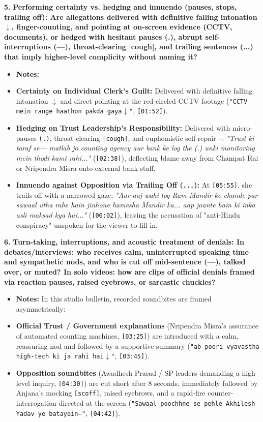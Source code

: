 \documentclass[10pt,a4paper]{article}
\begin{document}
\noindent\textbf{5.} \textbf{Performing certainty vs. hedging and innuendo (pauses, stops, trailing off): Are allegations delivered with definitive falling intonation $\downarrow$, finger-counting, and pointing at on-screen evidence (CCTV, documents), or hedged with hesitant pauses (.), abrupt self-interruptions (---), throat-clearing [cough], and trailing sentences (...) that imply higher-level complicity without naming it?}\par\smallskip
\begin{itemize}
  \item \textbf{Notes:}
  \item \textbf{Certainty on Individual Clerk's Guilt:} Delivered with definitive falling intonation \texttt{$\downarrow$} and direct pointing at the red-circled CCTV footage (\texttt{"CCTV mein range haathon pakda gaya$\downarrow$"}, \texttt{[01:52]}).
  \item \textbf{Hedging on Trust Leadership's Responsibility:} Delivered with micro-pauses \texttt{(.)}, throat-clearing \texttt{[cough]}, and euphemistic self-repair \texttt{---}: \textit{"Trust ki taraf se--- matlab jo counting agency aur bank ke log the (.) unki monitoring mein thodi kami rahi..."} (\texttt{[02:38]}), deflecting blame away from Champat Rai or Nripendra Misra onto external bank staff.
  \item \textbf{Innuendo against Opposition via Trailing Off (\texttt{...}):} At \texttt{[05:55]}, she trails off with a narrowed gaze: \textit{"Aur aaj wahi log Ram Mandir ke chande par sawaal utha rahe hain jinhone hamesha Mandir ka... aap jaante hain ki inka asli maksad kya hai..."} (\texttt{[06:02]}), leaving the accusation of "anti-Hindu conspiracy" unspoken for the viewer to fill in.
\end{itemize}

\noindent\textbf{6.} \textbf{Turn-taking, interruptions, and acoustic treatment of denials: In debates/interviews: who receives calm, uninterrupted speaking time and sympathetic nods, and who is cut off mid-sentence (---), talked over, or muted? In solo videos: how are clips of official denials framed via reaction pauses, raised eyebrows, or sarcastic chuckles?}\par\smallskip
\begin{itemize}
  \item \textbf{Notes:}
In this studio bulletin, recorded soundbites are framed asymmetrically:\par\smallskip
  \item \textbf{Official Trust / Government explanations} (Nripendra Misra's assurance of automated counting machines, \texttt{[03:25]}) are introduced with a calm, reassuring nod and followed by a supportive summary (\texttt{"ab poori vyavastha high-tech ki ja rahi hai$\downarrow$"}, \texttt{[03:45]}).
  \item \textbf{Opposition soundbites} (Awadhesh Prasad / SP leaders demanding a high-level inquiry, \texttt{[04:30]}) are cut short after 8 seconds, immediately followed by Anjana's mocking \texttt{[scoff]}, raised eyebrows, and a rapid-fire counter-interrogation directed at the screen (\texttt{"Sawaal poochhne se pehle Akhilesh Yadav ye batayein---"}, \texttt{[04:42]}).
\end{itemize}
\end{document}
